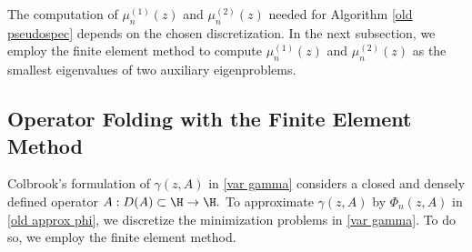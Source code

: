 

The computation of $\mu_n^{(1)}(z)$ and $\mu_n^{(2)}(z)$ needed for Algorithm \ref{old pseudospec} depends on the chosen discretization. In the next subsection, we employ the finite element method to compute $\mu_n^{(1)}(z)$ and $\mu_n^{(2)}(z)$ as the smallest eigenvalues of two auxiliary eigenproblems.







\subsection{Operator Folding with the Finite Element Method} \label{Fix matt}

Colbrook's formulation of $\gamma(z, A)$ in \eqref{var gamma} considers a closed and densely defined operator $A : D(A) \subset \H \rightarrow 
\H.$ To approximate $\gamma(z, A)$ by $\Phi_n(z, A)$ in \eqref{old approx phi}, we discretize the minimization problems in \eqref{var gamma}. To do so, we employ the finite element method. 

